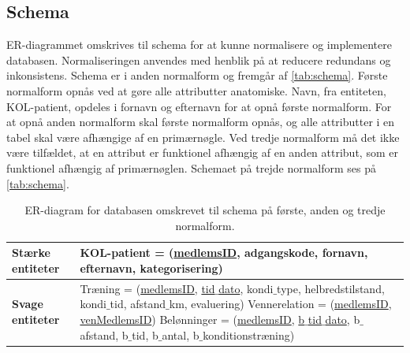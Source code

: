 \subsection{Schema}
ER-diagrammet omskrives til schema for at kunne normalisere og implementere databasen. Normaliseringen anvendes med henblik på at reducere redundans og inkonsistens. Schema er i anden normalform og fremgår af \autoref{tab:schema}. 
Første normalform opnås ved at gøre alle attributter anatomiske. Navn, fra entiteten, KOL-patient, opdeles i fornavn og efternavn for at opnå første normalform. For at opnå anden normalform skal første normalform opnås, og alle attributter i en tabel skal være afhængige af en primærnøgle. Ved tredje normalform må det ikke være tilfældet, at en attribut er funktionel afhængig af en anden attribut, som er funktionel afhængig af primærnøglen. Schemaet på trejde normalform ses på \autoref{tab:schema}.

\begin{table} [H]
	\centering
  \begin{tabular}{ | l | p{12cm} |} \hline
     \textbf{Stærke entiteter} & KOL-patient = (\underline{medlemsID}, adgangskode, fornavn, efternavn, kategorisering) \\ \hline
 	\textbf{Svage entiteter} & Træning = (\underline{medlemsID}, \underline{tid$\_$dato}, kondi$\_$type, helbredstilstand, kondi$\_$tid, afstand$\_$km, evaluering)
 \newline Vennerelation = (\underline{medlemsID}, \underline{venMedlemsID})
\newline Belønninger = (\underline{medlemsID}, \underline{b$\_$tid$\_$dato}, b$\_$afstand, b$\_$tid, b$\_$antal, b$\_$konditionstræning)\\ \hline
    \end{tabular}
    \caption{ER-diagram for databasen omskrevet til schema på første, anden og tredje normalform.}
    \label{tab:schema}
\end{table}

